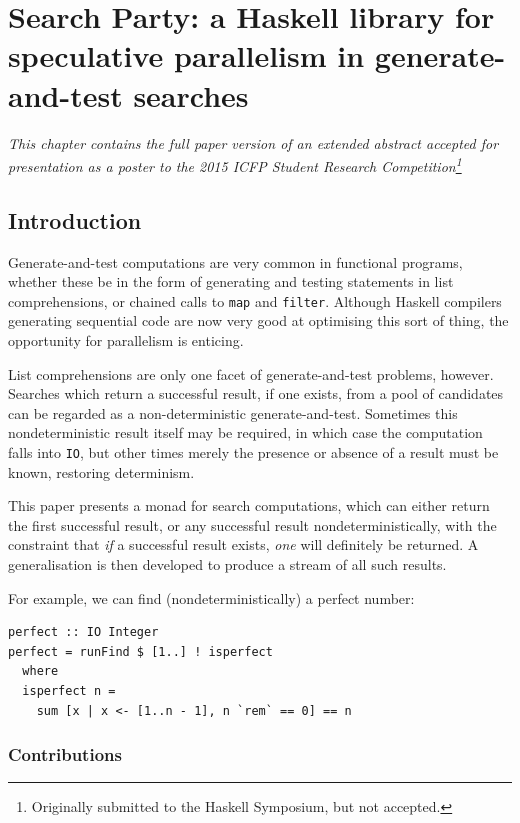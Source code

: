 \chapter{Search Party: a Haskell library for speculative parallelism in
  generate-and-test searches}
\label{chp:searchparty}

\textit{This chapter contains the full paper version of an extended
  abstract accepted for presentation as a poster to the 2015 ICFP
  Student Research Competition\footnote{Originally submitted to the
    Haskell Symposium\cite{searchparty}, but not accepted.}}

\section{Introduction}
\label{sec:searchparty-intro}

Generate-and-test computations are very common in functional programs,
whether these be in the form of generating and testing statements in
list comprehensions, or chained calls to \verb|map| and
\verb|filter|. Although Haskell compilers generating sequential code
are now very good at optimising this sort of thing, the opportunity
for parallelism is enticing.

List comprehensions are only one facet of generate-and-test problems,
however. Searches which return a successful result, if one exists,
from a pool of candidates can be regarded as a non-deterministic
generate-and-test. Sometimes this nondeterministic result itself may
be required, in which case the computation falls into \verb|IO|, but
other times merely the presence or absence of a result must be known,
restoring determinism.

This paper presents a monad for search computations, which can either
return the first successful result, or any successful result
nondeterministically, with the constraint that \textit{if} a
successful result exists, \textit{one} will definitely be returned. A
generalisation is then developed to produce a stream of all such
results.

For example, we can find (nondeterministically) a perfect number:

\begin{verbatim}
perfect :: IO Integer
perfect = runFind $ [1..] ! isperfect
  where
  isperfect n =
    sum [x | x <- [1..n - 1], n `rem` == 0] == n
\end{verbatim}

\subsection*{Contributions}

